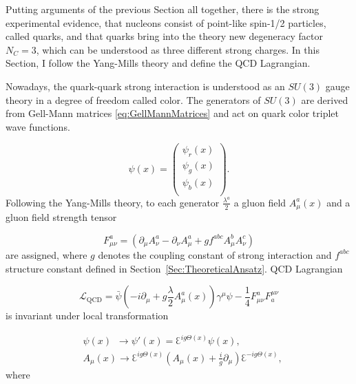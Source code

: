 Putting arguments of the previous Section all together, there is the strong
experimental evidence, that nucleons consist of point-like spin-1/2 particles,
called quarks, and that quarks bring into the theory new degeneracy factor $N_C =
3$, which can be understood as three different strong charges. In
this Section, I follow the Yang-Mills theory \cite{YangMill} and define the QCD
Lagrangian.

Nowadays, the quark-quark strong interaction is understood as an $SU(3)$ gauge theory in
a degree of freedom called color. The generators of $SU(3)$ are derived from
Gell-Mann matrices \eqref{eq:GellMannMatrices} and act on quark color triplet
wave functions.

\begin{equation}
  \psi(x) = \begin{pmatrix}  
    \psi_r(x) \\ \psi_g(x) \\ \psi_b(x) \\ 
            \end{pmatrix}.
  \label{eq:QuarkWaveFunction}
\end{equation}
Following the Yang-Mills theory, to each generator
$\frac{\lambda^a}{2}$ a gluon field $A_\mu^a(x)$ and a gluon field strength tensor

\begin{equation}
  F_{\mu\nu}^a = \left( \partial_\mu A_\nu^a - \partial_\nu A_\mu^a + g f^{abc}
  A_\mu^b A_\nu^c \right)
  \label{eq:GluonFieldStrengthTensor}
\end{equation}
are assigned, where $g$ denotes the coupling constant of strong interaction and
$f^{abc}$ structure constant defined in Section~\ref{Sec:TheoreticalAnsatz}.
QCD Lagrangian

\begin{equation}
  \mathscr{L}_{\text{QCD}} = \bar{\psi} \left( -i \partial_\mu + g \frac{\lambda}{2}
  A_\mu^a(x) \right) \gamma^\mu \psi - \frac{1}{4}F_{\mu\nu}^aF_a^{\mu\nu}
  \label{eq:QCDLagrangian}
\end{equation}
is invariant under local transformation

\begin{align}
  &\psi(x) \, \, \, \rightarrow \psi'(x) = \Euler^{ig\Theta(x)} \psi(x),
    \label{eq:QCDGaugeTranform} \\
  &A_\mu(x) \rightarrow \Euler^{ig\Theta(x)} \left( A_\mu(x) +
    \frac{i}{g}\partial_\mu \right) \Euler^{-ig\Theta(x)}, 
  \nonumber
\end{align}
where

